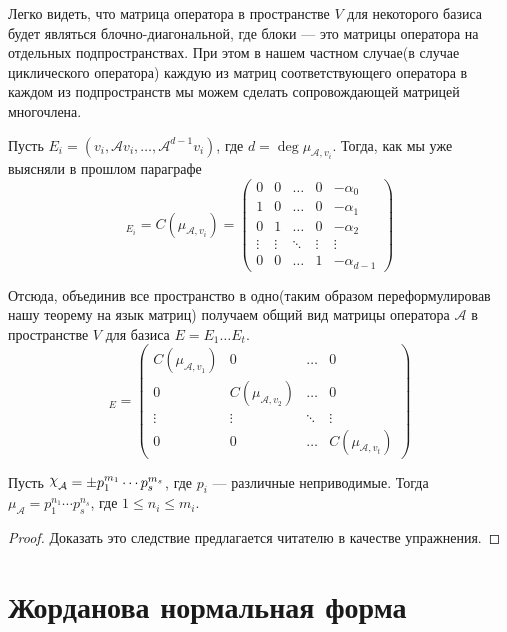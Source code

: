 \documentclass[../main.tex]{subfiles}
\begin{document}
Легко видеть, что матрица оператора в пространстве $V$ для некоторого базиса будет являться блочно-диагональной, где блоки --- это матрицы оператора на отдельных подпространствах. При этом в нашем частном случае(в случае циклического оператора) каждую из матриц соответствующего оператора в каждом из подпространств мы можем сделать сопровождающей матрицей многочлена.

Пусть $E_i = (v_i, \mathcal{A}v_i, \dotsc, \mathcal{A}^{d - 1}v_i)$, где $d = \deg \mu_{\mathcal{A}, v_i}$. Тогда, как мы уже выясняли в прошлом параграфе
\begin{equation*}
  [\mathcal{A} |_{L_{v_i}}]_{E_i}
  =
  C(\mu_{\mathcal{A}, v_i})
  =
  \begin{pmatrix}
    0 & 0 & \hdots & 0 & -\alpha_0 \\
    1 & 0 & \hdots & 0 & -\alpha_1 \\
    0 & 1 & \hdots & 0 & -\alpha_2 \\
    \vdots & \vdots & \ddots & \vdots & \vdots \\
    0 & 0 & \hdots & 1 & -\alpha_{d - 1}
  \end{pmatrix}
\end{equation*}

Отсюда, объединив все пространство в одно(таким образом переформулировав нашу теорему на язык матриц) получаем общий вид матрицы оператора $\mathcal{A}$ в пространстве $V$ для базиса $E = E_1 \dotso E_t$.
\begin{equation*}
  [\mathcal{A}]_E =
  \begin{pmatrix}
    C(\mu_{\mathcal{A}, v_1}) & 0 & \hdots & 0 \\
    0 & C(\mu_{\mathcal{A}, v_2}) & \hdots & 0 \\
    \vdots & \vdots & \ddots & \vdots \\
    0 & 0 & \hdots & C(\mu_{\mathcal{A}, v_t})
  \end{pmatrix}
\end{equation*}

\begin{corollary*}
  Пусть $\rchi_{\mathcal{A}} = \pm p_1^{m_1} \dotsm p_s^{m_s}$, где $p_i$ --- различные неприводимые. Тогда $\mu_{\mathcal{A}} = p_1^{n_1} \dotsm p_s^{n_s}$, где $1 \leq n_i \leq m_i$.
\end{corollary*}
\begin{proof}
  Доказать это следствие предлагается читателю в качестве упражнения.
\end{proof}

\section{Жорданова нормальная форма}
\end{document}
